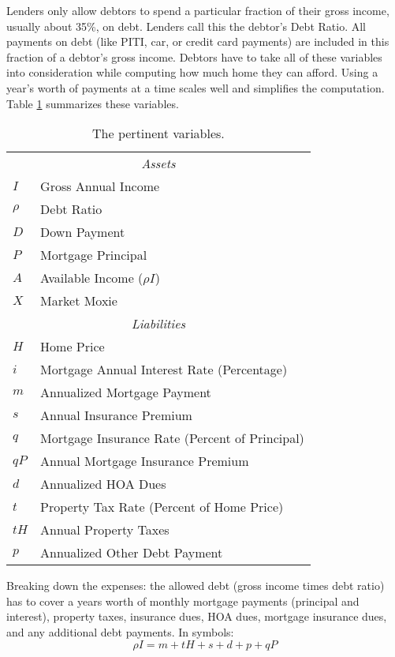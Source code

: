 \documentclass{article}
\begin{document}
Lenders only allow debtors to spend a particular fraction of their
 gross income, usually about 35\%, on debt.
Lenders call this the debtor's Debt Ratio. All 
payments on debt (like PITI, car, or credit card payments) are
included in this fraction of a debtor's gross income.
Debtors have to take all of these variables into consideration while 
computing how much  home they can afford. 
Using a year's worth of 
payments at a time scales well and simplifies the computation.
Table \ref{table:variables} summarizes these variables.

\begin{table}
\begin{center}
\begin{tabular}{ll}
\hline
\hline
\multicolumn{2}{c}{\emph{Assets}} \\
$I$ & Gross Annual Income \\
$\rho$ & Debt Ratio \\
$D$ & Down Payment \\
$P$ & Mortgage Principal \\
$A$ & Available Income ($\rho I$) \\
$X$ & Market Moxie \\
\hline
\multicolumn{2}{c}{\emph{Liabilities}} \\
$H$ & Home Price \\
$i$ & Mortgage Annual Interest Rate (Percentage)\\
$m$ & Annualized Mortgage Payment \\
$s$ & Annual Insurance Premium \\
$q$ & Mortgage Insurance Rate (Percent of Principal)\\
$qP$ & Annual Mortgage Insurance Premium \\
$d$ & Annualized HOA Dues \\
$t$ & Property Tax Rate (Percent of Home Price) \\
$tH$ & Annual Property Taxes \\
$p$ & Annualized Other Debt Payment \\
\hline
\hline
\end{tabular}
\caption{The pertinent variables.}
\label{table:variables}
\end{center}
\end{table}

\pagebreak

Breaking down the expenses: the allowed
debt (gross income times debt ratio) has to cover 
a years worth of monthly mortgage payments (principal and interest),
 property taxes, insurance dues, HOA dues, mortgage insurance dues, and  
any additional debt payments. In symbols:
\begin{equation}
\label{DebtRatio}
\rho I = m + tH + s + d + p + qP
\end{equation}
\end{document}

